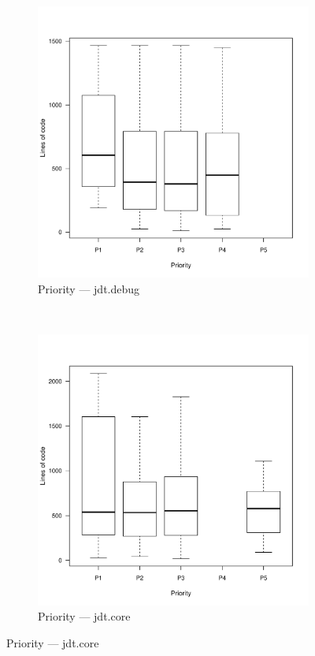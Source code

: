 \begin{figure}
        \begin{subfigure}[b]{0.5\textwidth}
                \centering
                \includegraphics[width=\textwidth]{img/debug-unique-prio-boxplot.pdf}
                \caption{Priority --- jdt.debug}
                \label{fig:box-prio-debug}
        \end{subfigure}%
        ~ %
        \begin{subfigure}[b]{0.5\textwidth}
                \centering
                \includegraphics[width=\textwidth]{img/core-unique-prio-boxplot.pdf}
                \caption{Priority --- jdt.core}
                \label{fig:box-prio-core}
        \end{subfigure}


\end{figure}
